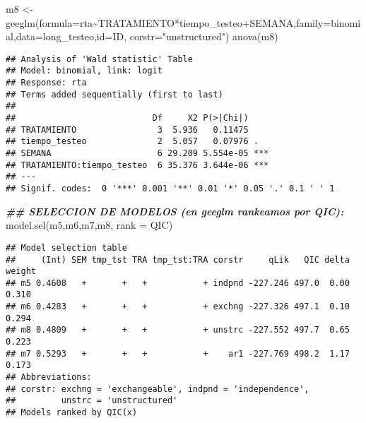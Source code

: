 \documentclass[
]{article}
\newenvironment{Shaded}{\begin{snugshade}}{\end{snugshade}}
\newcommand{\AttributeTok}[1]{\textcolor[rgb]{0.77,0.63,0.00}{#1}}
\newcommand{\DocumentationTok}[1]{\textcolor[rgb]{0.56,0.35,0.01}{\textbf{\textit{#1}}}}
\newcommand{\FunctionTok}[1]{\textcolor[rgb]{0.00,0.00,0.00}{#1}}
\newcommand{\NormalTok}[1]{#1}
\newcommand{\OtherTok}[1]{\textcolor[rgb]{0.56,0.35,0.01}{#1}}
\newcommand{\SpecialCharTok}[1]{\textcolor[rgb]{0.00,0.00,0.00}{#1}}
\newcommand{\StringTok}[1]{\textcolor[rgb]{0.31,0.60,0.02}{#1}}
\begin{document}
\begin{Shaded}
\begin{Highlighting}[]
\NormalTok{m8 }\OtherTok{\textless{}{-}} \FunctionTok{geeglm}\NormalTok{(}\AttributeTok{formula=}\NormalTok{rta}\SpecialCharTok{\textasciitilde{}}\NormalTok{TRATAMIENTO}\SpecialCharTok{*}\NormalTok{tiempo\_testeo}\SpecialCharTok{+}\NormalTok{SEMANA,}\AttributeTok{family=}\NormalTok{binomial,}\AttributeTok{data=}\NormalTok{long\_testeo,}\AttributeTok{id=}\NormalTok{ID,}
             \AttributeTok{corstr=}\StringTok{"unstructured"}\NormalTok{)}
\FunctionTok{anova}\NormalTok{(m8)}
\end{Highlighting}
\end{Shaded}

\begin{verbatim}
## Analysis of 'Wald statistic' Table
## Model: binomial, link: logit
## Response: rta
## Terms added sequentially (first to last)
## 
##                           Df     X2 P(>|Chi|)    
## TRATAMIENTO                3  5.936   0.11475    
## tiempo_testeo              2  5.057   0.07976 .  
## SEMANA                     6 29.209 5.554e-05 ***
## TRATAMIENTO:tiempo_testeo  6 35.376 3.644e-06 ***
## ---
## Signif. codes:  0 '***' 0.001 '**' 0.01 '*' 0.05 '.' 0.1 ' ' 1
\end{verbatim}

\begin{Shaded}
\begin{Highlighting}[]
\DocumentationTok{\#\# SELECCION DE MODELOS (en geeglm rankeamos por QIC):}
\FunctionTok{model.sel}\NormalTok{(m5,m6,m7,m8, }\AttributeTok{rank =}\NormalTok{ QIC)}
\end{Highlighting}
\end{Shaded}

\begin{verbatim}
## Model selection table 
##     (Int) SEM tmp_tst TRA tmp_tst:TRA corstr     qLik   QIC delta weight
## m5 0.4608   +       +   +           + indpnd -227.246 497.0  0.00  0.310
## m6 0.4283   +       +   +           + exchng -227.326 497.1  0.10  0.294
## m8 0.4809   +       +   +           + unstrc -227.552 497.7  0.65  0.223
## m7 0.5293   +       +   +           +    ar1 -227.769 498.2  1.17  0.173
## Abbreviations:
## corstr: exchng = 'exchangeable', indpnd = 'independence', 
##         unstrc = 'unstructured'
## Models ranked by QIC(x)
\end{verbatim}
\end{document}
